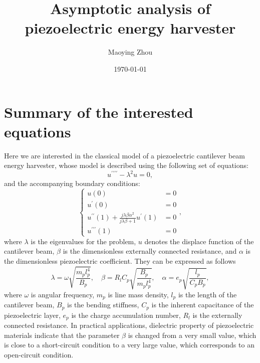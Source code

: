 \documentclass{article}
\title{Asymptotic analysis of piezoelectric energy harvester}
\author{Maoying Zhou}
\date{\today}
\begin{document}
\maketitle


\section{Summary of the interested equations}

Here we are interested in the classical model of a piezoelectric cantilever beam energy harvester, whose model is described using the following set of equations:
\begin{equation}
    u^{\prime\prime\prime\prime} - \lambda^2 u = 0,
\end{equation}
and the accompanying boundary conditions:
\begin{equation}
    \left\{\begin{aligned}
        u(0) &= 0 \\
        u^\prime(0) &= 0 \\
        u^{\prime\prime}(1) + \frac{j\lambda \beta \alpha^2}{ j\lambda \beta + 1 } u^\prime(1) &= 0 \\
        u^{\prime\prime\prime}(1) &= 0
    \end{aligned}\right.,
\end{equation}
where $\lambda$ is the eigenvalues for the problem, $u$ denotes the displace function of the cantilever beam, $\beta$ is the dimensionless externally connected resistance, and $\alpha$ is the dimensionless piezoelectric coefficient. They can be expressed as follows
\begin{equation}
    \lambda = \omega \sqrt{ \frac{ m_p l_p^4 }{ B_p } }, \quad \beta = R_l C_p \sqrt{\frac{B_p}{m_p l_p^4}}, \quad \alpha = e_p \sqrt{\frac{l_p}{C_p B_p}},
\end{equation}
where $\omega$ is angular frequency, $m_p$ is line mass density, $l_p$ is the length of the cantilever beam, $B_p$ is the bending stiffness, $C_p$ is the inherent capacitance of the piezoelectric layer, $e_p$ is the charge accumulation number, $R_l$ is the externally connected resistance. In practical applications, dielectric property of piezoelectric materials indicate that the parameter $\beta$ is changed from a very small value, which is close to a short-circuit condition to a very large value, which corresponds to an open-circuit condition. 
\end{document}
